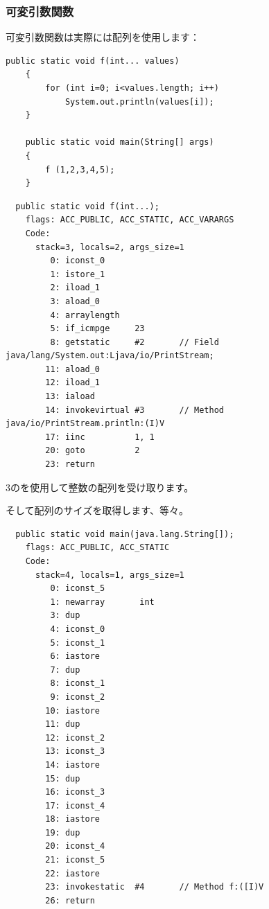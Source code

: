 \subsubsection{可変引数関数}

可変引数関数は実際には配列を使用します：


\begin{lstlisting}[style=customjava]
	public static void f(int... values)
	{
		for (int i=0; i<values.length; i++)
			System.out.println(values[i]);
	}

	public static void main(String[] args) 
	{
		f (1,2,3,4,5);
	}
\end{lstlisting}

\begin{lstlisting}
  public static void f(int...);
    flags: ACC_PUBLIC, ACC_STATIC, ACC_VARARGS
    Code:
      stack=3, locals=2, args_size=1
         0: iconst_0      
         1: istore_1      
         2: iload_1       
         3: aload_0       
         4: arraylength   
         5: if_icmpge     23
         8: getstatic     #2       // Field java/lang/System.out:Ljava/io/PrintStream;
        11: aload_0       
        12: iload_1       
        13: iaload        
        14: invokevirtual #3       // Method java/io/PrintStream.println:(I)V
        17: iinc          1, 1
        20: goto          2
        23: return        
\end{lstlisting}

3のを使用して整数の配列を受け取ります。

そして配列のサイズを取得します、等々。


\begin{lstlisting}
  public static void main(java.lang.String[]);
    flags: ACC_PUBLIC, ACC_STATIC
    Code:
      stack=4, locals=1, args_size=1
         0: iconst_5      
         1: newarray       int
         3: dup           
         4: iconst_0      
         5: iconst_1      
         6: iastore       
         7: dup           
         8: iconst_1      
         9: iconst_2      
        10: iastore       
        11: dup           
        12: iconst_2      
        13: iconst_3      
        14: iastore       
        15: dup           
        16: iconst_3      
        17: iconst_4      
        18: iastore       
        19: dup           
        20: iconst_4      
        21: iconst_5      
        22: iastore       
        23: invokestatic  #4       // Method f:([I)V
        26: return        
\end{lstlisting}


